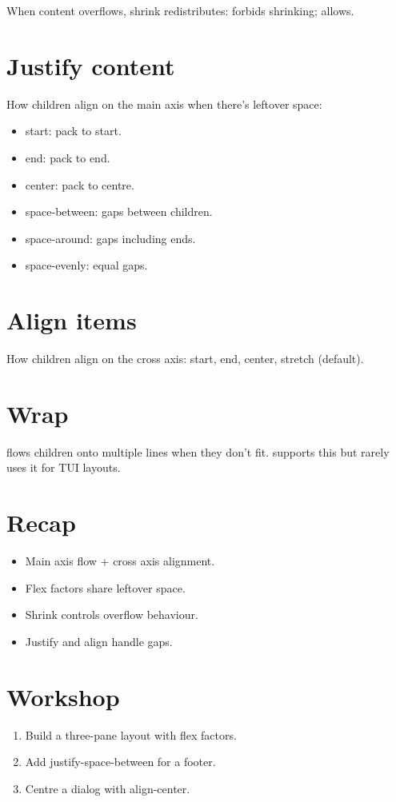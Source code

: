 When content overflows, shrink redistributes:
 forbids shrinking;  allows.

\section{Justify content}

How children align on the main axis when there's leftover
space:

\begin{itemize}[leftmargin=*]
  \item start: pack to start.
  \item end: pack to end.
  \item center: pack to centre.
  \item space-between: gaps between children.
  \item space-around: gaps including ends.
  \item space-evenly: equal gaps.
\end{itemize}

\section{Align items}

How children align on the cross axis:
start, end, center, stretch (default).

\section{Wrap}

 flows children onto multiple lines when
they don't fit. \maya{} supports this but rarely uses it
for TUI layouts.

\section{Recap}

\begin{recap}
\begin{itemize}[leftmargin=*]
  \item Main axis flow + cross axis alignment.
  \item Flex factors share leftover space.
  \item Shrink controls overflow behaviour.
  \item Justify and align handle gaps.
\end{itemize}
\end{recap}

\section*{Workshop}

\begin{enumerate}[leftmargin=*]
  \item Build a three-pane layout with flex factors.
  \item Add justify-space-between for a footer.
  \item Centre a dialog with align-center.
\end{enumerate}
